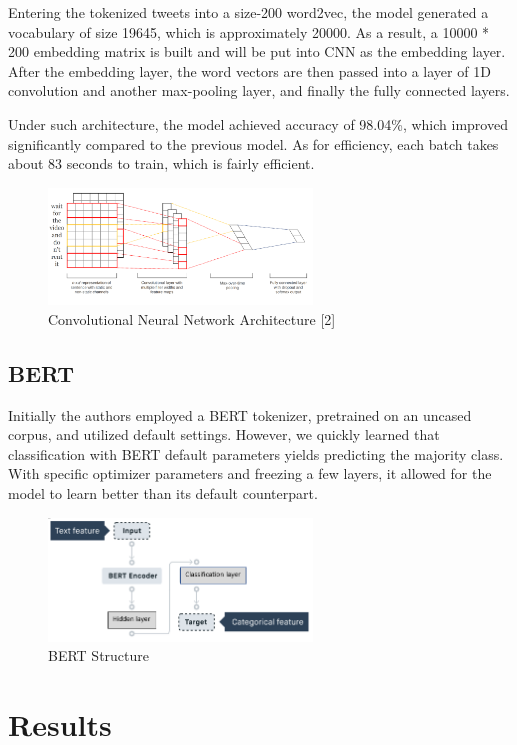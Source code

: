 \documentclass[conference]{IEEEtran}
\begin{document}
Entering the tokenized tweets into a size-200 word2vec, the model generated a vocabulary of size 19645, which is approximately 20000. As a result, a 10000 * 200 embedding matrix is built and will be put into CNN as the embedding layer. After the embedding layer, the word vectors are then passed into a layer of 1D convolution and another max-pooling layer, and finally the fully connected layers.

Under such architecture, the model achieved accuracy of 98.04\%, which improved significantly compared to the previous model. As for efficiency, each batch takes about 83 seconds to train, which is fairly efficient.

\begin{figure}[htbp]
\centerline{\includegraphics[width=70mm]{fig2.png}}
\caption{Convolutional Neural Network Architecture [2]}
\label{fig}
\end{figure}

\subsection{BERT}

Initially the authors employed a BERT tokenizer, pretrained on an uncased corpus, and utilized default settings. However, we quickly learned that classification with BERT default parameters yields predicting the majority class. With specific optimizer parameters and freezing a few layers, it allowed for the model to learn better than its default counterpart.

\begin{figure}[htbp]
\centerline{\includegraphics[width=70mm]{fig3.png}}
\caption{BERT Structure}
\label{fig}
\end{figure}

\section{Results}
\end{document}
